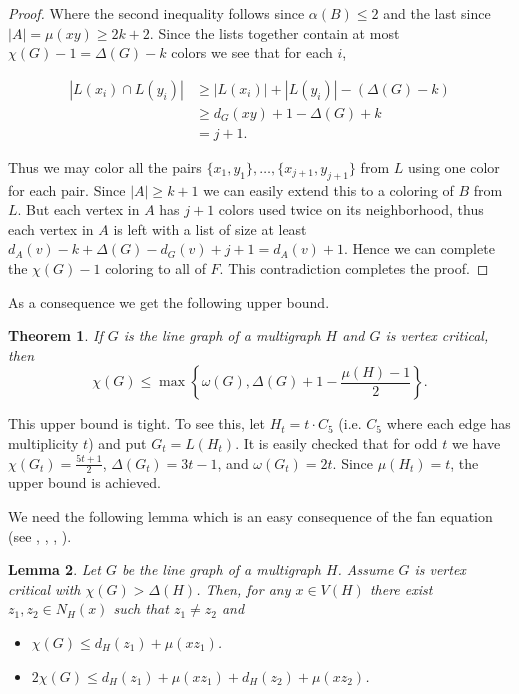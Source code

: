 \documentclass[12pt]{article}
\theoremstyle{plain}
\newtheorem{thm}{Theorem}[section]
\newtheorem{lem}[thm]{Lemma}
\theoremstyle{definition}
\theoremstyle{remark}
\begin{document}
\begin{proof}
Where the second inequality follows since $\alpha(B) \leq 2$ and the last since $|A| = \mu(xy) \geq 2k + 2$.  Since the lists together contain at most $\chi(G) - 1 = \Delta(G) - k$ colors we see that for each $i$,

\begin{align*}
\left|L(x_i) \cap L(y_i)\right| &\geq |L(x_i)| + |L(y_i)| - (\Delta(G) - k) \\
&\geq d_G(xy) + 1 - \Delta(G) + k \\
&=j + 1.
\end{align*}

Thus we may color all the pairs $\{x_1, y_1\}, \ldots, \{x_{j+1}, y_{j+1}\}$ from $L$ using one color for each pair.  Since $|A| \geq k + 1$ we can easily extend this to a coloring of $B$ from $L$.  But each vertex in $A$ has $j+1$ colors used twice on its neighborhood, thus each vertex in $A$ is left with a list of size at least $d_A(v) - k + \Delta(G) - d_G(v) + j + 1 = d_A(v) + 1$.  Hence we can complete the $\chi(G) - 1$ coloring to all of $F$.  This contradiction completes the proof.

\end{proof}

As a consequence we get the following upper bound.

\begin{thm}\label{CriticalMuBound}
If $G$ is the line graph of a multigraph $H$ and $G$ is vertex critical, then
\[\chi(G) \leq \max\left\{\omega(G), \Delta(G) + 1 - \frac{\mu(H) - 1}{2}\right\}.\]
\end{thm}

This upper bound is tight.  To see this, let $H_t = t \cdot C_5$ (i.e. $C_5$ where each edge has multiplicity $t$) and put $G_t = L(H_t)$.  It is easily checked that for odd $t$ we have $\chi(G_t) = \frac{5t + 1}{2}$, $\Delta(G_t) = 3t - 1$, and $\omega(G_t) = 2t$.  Since $\mu(H_t) = t$, the upper bound is achieved.\newline

We need the following lemma which is an easy consequence of the fan equation (see \cite{Andersen}, \cite{Cariolaro}, \cite{Stiebitz}, \cite{GoldbergJGT}).
\begin{lem}\label{FanEquation}
Let $G$ be the line graph of a multigraph $H$.  Assume $G$ is vertex critical with $\chi(G) > \Delta(H)$. Then, for any $x \in V(H)$ there exist $z_1, z_2 \in N_H(x)$ such that $z_1 \neq z_2$ and 
\begin{itemize}
\item $\chi(G) \leq d_H(z_1) + \mu(xz_1)$.
\item $2\chi(G) \leq d_H(z_1) + \mu(xz_1) + d_H(z_2) + \mu(xz_2)$.
\end{itemize}
\end{lem}
\end{document}
